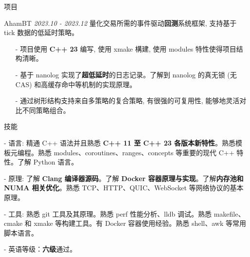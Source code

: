 \documentclass{resume} %
\begin{document}
\begin{rSection}{项目}
\begin{rSubsection}
    {AhamBT} {\em 2023.10 - 2023.12}
    {量化交易所需的事件驱动\textbf{回测}系统框架, 支持基于 tick 数据的低延时策略。}
    {}
    \item[]
    \begin{itemize}
        \setlength\itemsep{-0.5em}
        \item[-] 项目使用 \textbf{C++ 23} 编写, 使用 xmake 構建, 使用 modules 特性使得项目结构清晰。
        \item[-] 基于 nanolog 实现了\textbf{超低延时}的日志记录。了解到 nanolog 的真无锁 (无 CAS) 和高缓存命中等机制的实现原理。
        \item[-] 通过树形结构支持来自多策略的复合策略, 有很强的可复用性, 能够地灵活对比不同策略组合。
    \end{itemize}
\end{rSubsection}
\end{rSection}


\begin{rSection}{技能}
\begin{rSubsection}
{}{}{}{}
\item[-] 语言: 精通 C++ 语法并且熟悉 \textbf{C++ 11 至 C++ 23 各版本新特性}。熟悉模板元编程。熟悉 modules、coroutines、ranges、concepts 等重要的现代 C++ 特性。了解 Python 语言。
\item[-] 原理: 了解 \textbf{Clang 编译器源码}。了解 \textbf{Docker 容器原理与实现}。了解\textbf{内存池和 NUMA 相关优化}。熟悉 TCP、HTTP、QUIC、WebSocket 等网络协议的基本原理。
\item[-] 工具: 熟悉 git 工具及其原理。熟悉 perf 性能分析、lldb 调试。熟悉 makefile、cmake 和 xmake 等构建工具。有 Docker 容器使用经验。熟悉 shell、awk 等常用脚本语言。
\item[-] 英语等级：\textbf{六级}通过。
\end{rSubsection}
\end{rSection}

\end{document}
